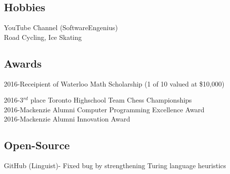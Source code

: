 \documentclass[]{deedy-resume-openfont}
\begin{document}
\begin{minipage}[t]{0.33\textwidth}
\subsection{Hobbies}
YouTube Channel (SoftwareEngenius)\\
Road Cycling, Ice Skating\\

\vspace{2mm}

\subsection{Awards}


2016-Receipient of Waterloo Math Scholarship (1 of 10 valued at \$10,000) \\
\vspace{1mm}

2016-3$^{rd}$ place Toronto Highschool Team Chess Championships \\
\vspace{1mm}
2016-Mackenzie Alumni Computer Programming Excellence Award \\
\vspace{1mm}
2016-Mackenzie Alumni Innovation Award\\

\vspace{2mm}

\subsection{Open-Source}
GitHub (Linguist)- Fixed bug by strengthening Turing language heuristics
\sectionsep



\end{minipage}
\end{document}
